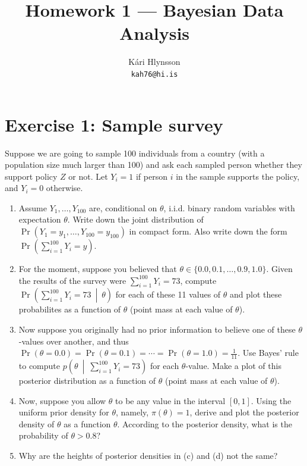 \documentclass{report}
\title{Homework 1 — Bayesian Data Analysis}
\author{Kári Hlynsson \\ \texttt{kah76@hi.is}}
\date{}
\begin{document}
\maketitle
\onehalfspacing
\thispagestyle{fancy}


\section*{Exercise 1: Sample survey}
Suppose we are going to sample 100 individuals from a country (with a population size much larger than 100) and ask each sampled person whether they support policy $Z$ or not. Let $Y_i = 1$ if person $i$ in the sample supports the policy, and $Y_i = 0$ otherwise.

\begin{enumerate}[label=(\alph*)]
    \item Assume $Y_1, \ldots, Y_{100}$ are, conditional on $\theta$, i.i.d. binary random variables with expectation $\theta$. Write down the joint distribution of $\Pr(Y_1 = y_1, \ldots, Y_{100} = y_{100})$ in compact form. Also write down the form $\Pr\left(\sum_{i = 1}^{100} Y_i  = y\right)$.

    \item For the moment, suppose you believed that $\theta \in \{0.0, 0.1, \ldots, 0.9, 1.0\}$. Given the results of the survey were $\sum_{i = 1}^{100} Y_i = 73$, compute $\Pr\left(\sum_{i = 1}^{100} Y_i = 73 \ \middle\vert \ \theta\right)$ for each of these 11 values of $\theta$ and plot these probabilites as a function of $\theta$ (point mass at each value of $\theta$).

    \item Now suppose you originally had no prior information to believe one of these $\theta$-values over another, and thus $\Pr(\theta = 0.0) = \Pr(\theta = 0.1) = \cdots = \Pr(\theta = 1.0) = \frac{1}{11}$. Use Bayes' rule to compute $p\left(\theta \ \middle\vert \ \sum_{i = 1}^{100} Y_i = 73\right)$ for each $\theta$-value. Make a plot of this posterior distribution as a function of $\theta$ (point mass at each value of $\theta$).

    \item Now, suppose you allow $\theta$ to be any value in the interval $[0, 1]$. Using the uniform prior density for $\theta$, namely, $\pi(\theta) = 1$, derive and plot the posterior density of $\theta$ as a function $\theta$. According to the posterior density, what is the probability of $\theta > 0.8$?

    \item Why are the heights of posterior densities in (c) and (d) not the same?
\end{enumerate}
\end{document}
